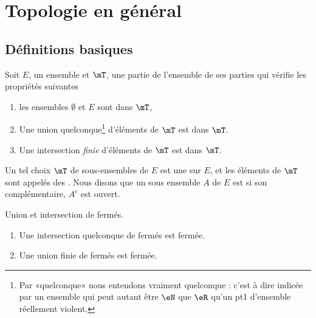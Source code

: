 
\section{Topologie en général}

\subsection{Définitions basiques}

\begin{definition}		\label{DefTopologieGene}
Soit $E$, un ensemble et $\mT$, une partie de l'ensemble de ses parties qui vérifie les propriétés suivantes
\begin{enumerate}
\item
les ensembles $\emptyset$ et $E$ sont dans $\mT$,
\item
    Une union quelconque\footnote{Par «quelconque» nous entendons vraiment quelconque : c'est à dire indicée par un ensemble qui peut autant être \( \eN\) que \( \eR\) qu'un pt1 d'ensemble réellement violent.} d'éléments de \( \mT\) est dans \( \mT\).
\item
    Une intersection \emph{finie} d'éléments de \( \mT\) est dans \( \mT\).

\end{enumerate}
Un tel choix $\mT$ de sous-ensembles de $E$ est une   sur $E$, et les éléments de $\mT$ sont appelés des . Nous disons que un sous ensemble $A$ de $E$ est  si son complémentaire, $A^c$ est ouvert.
\end{definition}

\begin{lemma}   \label{LemQYUJwPC}
    Union et intersection de fermés.
    \begin{enumerate}
        \item
            Une intersection quelconque de fermés est fermée.
        \item       \label{ItemKJYVooMBmMbG}
            Une union finie de fermés est fermée.
    \end{enumerate}
\end{lemma}

